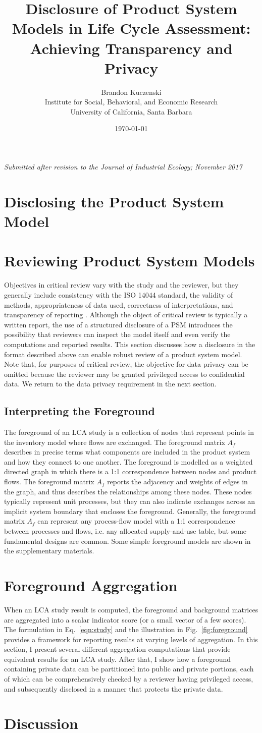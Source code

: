 \documentclass[12pt]{article}
\title{Disclosure of Product System Models in Life Cycle Assessment: Achieving Transparency and Privacy}
\author{Brandon Kuczenski\\
Institute for Social, Behavioral, and Economic Research\\
University of California, Santa Barbara}
\date{\mydate\today}
\def\mainpaper{

  \maketitle
  \emph{Submitted after revision to the Journal of Industrial Ecology; November 2017}

  

  \doublespacing
  \linenumbers


  
\section{Disclosing the Product System Model}

  
  


\section{Reviewing Product System Models}

Objectives in critical review vary with the study and the reviewer, but they generally include consistency with the ISO 14044 standard, the validity of methods, appropriateness of data used, correctness of interpretations, and transparency of reporting \citep[Section 6.1]{iso14044}.  Although the object of critical review is typically a written report, the use of a structured disclosure of a PSM introduces the possibility that reviewers can inspect the model itself and even verify the computations and reported results.  This section discusses how a disclosure in the format described above can enable robust review of a product system model.  Note that, for purposes of critical review, the objective for data privacy can be omitted because the reviewer may be granted privileged access to confidential data.  We return to the data privacy requirement in the next section.

\subsection{Interpreting the Foreground}

The foreground of an LCA study is a collection of nodes that represent points in the inventory model where flows are exchanged.  The foreground matrix $A_f$ describes in precise terms what components are included in the product system and how they connect to one another.  The foreground is modelled as a weighted directed graph in which there is a 1:1 correspondence between nodes and product flows.  The foreground matrix $A_f$ reports the adjacency and weights of edges in the graph, and thus describes the relationships among these nodes.  These nodes typically represent unit processes, but they can also indicate exchanges across an implicit system boundary that encloses the foreground.  Generally, the foreground matrix $A_f$ can represent any process-flow model with a 1:1 correspondence between processes and flows, i.e. any allocated supply-and-use table, but some fundamental designs are common.  Some simple foreground models are shown in the supplementary materials.


\section{Foreground Aggregation}

When an LCA study result is computed, the foreground and background matrices are aggregated into a scalar indicator score (or a small vector of a few scores).  The formulation in Eq.~\ref{eqn:study} and the illustration in Fig.~\ref{fig:foreground} provides a framework for reporting results at varying levels of aggregation.  In this section, I present several different aggregation computations that provide equivalent results for an LCA study.   After that, I show how a foreground containing private data can be partitioned into public and private portions, each of which can be comprehensively checked by a reviewer having privileged access, and subsequently disclosed in a manner that protects the private data.



\section{Discussion}



  
  
%  

%  
  
%  
  
%  

%  

 \singlespacing
 
}
\def\supporting{
  \renewcommand{\thefigure}{S\arabic{figure}}
  \renewcommand{\thetable}{S\arabic{table}}

  \maketitle

  \begin{center}
    \Large Supporting Information
  \end{center}


  

  

  
  
  
%  

%  
  
%  
  
%  

  \singlespacing
}
\def\unused{
  
}
\begin{document}
\mainpaper

\end{document}
